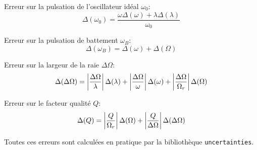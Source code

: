 Erreur sur la pulsation de l'oscillateur idéal \(\omega_0\):
\begin{equation}
    \Delta (\omega_0) = \frac{\omega \Delta (\omega) + \lambda \Delta (\lambda)}{\omega_0}
\end{equation}

Erreur sur la pulsation de battement \(\omega_B\):
\begin{equation}
    \Delta (\omega_B) = \Delta (\omega) + \Delta (\Omega)
\end{equation}

Erreur sur la largeur de la raie $\Delta \Omega$:
\begin{equation}
    \Delta (\Delta \Omega) = \left|\frac{\Delta \Omega}{\lambda}\right|\Delta (\lambda) + \left|\frac{\Delta \Omega}{\omega}\right| \Delta(\omega) + \left|\frac{\Delta \Omega}{\Omega_r}\right|\Delta(\Omega)
\end{equation}

Erreur sur le facteur qualité $Q$:
\begin{equation}
    \Delta (Q) = \left|\frac{Q}{\Omega_r}\right| \Delta (\Omega) + \left|\frac{Q}{\Delta \Omega}\right|\Delta(\Delta \Omega)
\end{equation}

Toutes ces erreurs sont calculées en pratique par la bibliothèque \texttt{uncertainties}.
